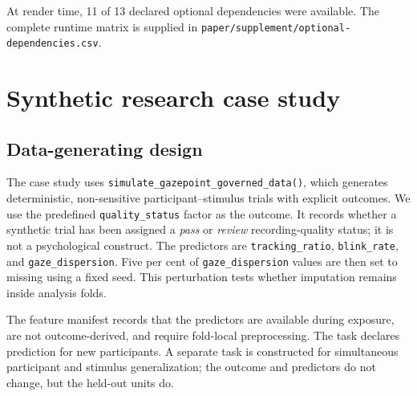 At render time, 11 of 13 declared optional dependencies were available. The complete runtime matrix is supplied in \texttt{paper/supplement/optional-dependencies.csv}.

\section{Synthetic research case study}\label{synthetic-research-case-study}

\subsection{Data-generating design}\label{data-generating-design}

The case study uses \texttt{simulate\_gazepoint\_governed\_data()}, which generates deterministic, non-sensitive participant--stimulus trials with explicit outcomes. We use the predefined \texttt{quality\_status} factor as the outcome. It records whether a synthetic trial has been assigned a \emph{pass} or \emph{review} recording-quality status; it is not a psychological construct. The predictors are \texttt{tracking\_ratio}, \texttt{blink\_rate}, and \texttt{gaze\_dispersion}. Five per cent of \texttt{gaze\_dispersion} values are then set to missing using a fixed seed. This perturbation tests whether imputation remains inside analysis folds.

\begin{table}
\centering
\caption{\label{tab:synthetic-data-structure}Synthetic case-study structure.}
\centering
{}
\end{table}

The feature manifest records that the predictors are available during exposure, are not outcome-derived, and require fold-local preprocessing. The task declares prediction for new participants. A separate task is constructed for simultaneous participant and stimulus generalization; the outcome and predictors do not change, but the held-out units do.

